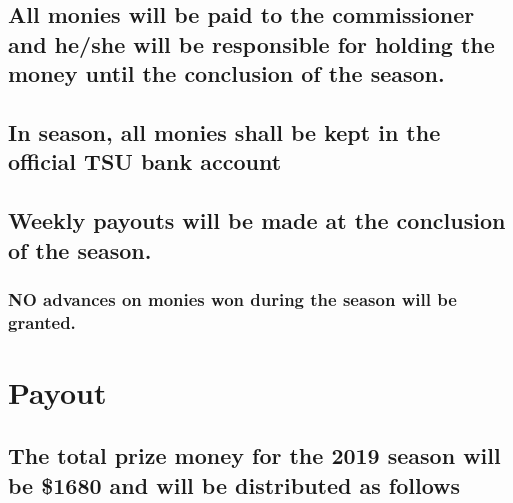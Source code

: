 \documentclass[]{book}
\begin{document}
\hypertarget{all-monies-will-be-paid-to-the-commissioner-and-heshe-will-be-responsible-for-holding-the-money-until-the-conclusion-of-the-season.}{%
\subsection{All monies will be paid to the commissioner and he/she will be responsible for holding the money until the conclusion of the season.}\label{all-monies-will-be-paid-to-the-commissioner-and-heshe-will-be-responsible-for-holding-the-money-until-the-conclusion-of-the-season.}}

\hypertarget{in-season-all-monies-shall-be-kept-in-the-official-tsu-bank-account}{%
\subsection{In season, all monies shall be kept in the official TSU bank account}\label{in-season-all-monies-shall-be-kept-in-the-official-tsu-bank-account}}

\hypertarget{weekly-payouts-will-be-made-at-the-conclusion-of-the-season.}{%
\subsection{Weekly payouts will be made at the conclusion of the season.}\label{weekly-payouts-will-be-made-at-the-conclusion-of-the-season.}}

\hypertarget{no-advances-on-monies-won-during-the-season-will-be-granted.}{%
\subsubsection{NO advances on monies won during the season will be granted.}\label{no-advances-on-monies-won-during-the-season-will-be-granted.}}

\hypertarget{payout}{%
\section{Payout}\label{payout}}

\hypertarget{the-total-prize-money-for-the-2019-season-will-be-1680-and-will-be-distributed-as-follows}{%
\subsection{The total prize money for the 2019 season will be \$1680 and will be distributed as follows}\label{the-total-prize-money-for-the-2019-season-will-be-1680-and-will-be-distributed-as-follows}}
\end{document}
